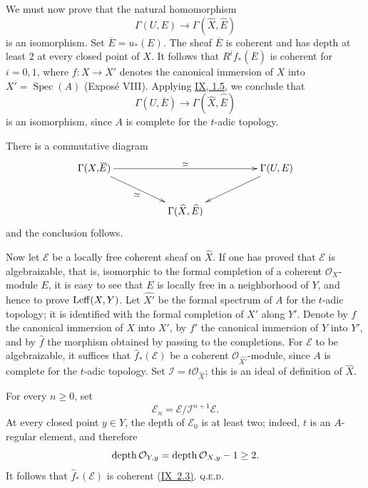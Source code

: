 We must now prove that the natural homomorphism
\begin{equation}\label{eq:X.1}
  \Gamma(U,E)\longrightarrow\Gamma(\widehat X,\widehat E)
\end{equation}
is an isomorphism. Set $\overline{\!E}=u_*(E)$. The sheaf
$\overline{\!E}$ is coherent and has depth at least $2$ at every closed
point of $X$. It follows that $R^if_*(\overline{\!E})$ is coherent for
$i=0,1$, where $f\colon X\to X'$ denotes the canonical immersion of $X$
into $X'=\operatorname{Spec}(A)$ (Exposé VIII). Applying \hyperref[IX.1.5]{IX, 1.5}, we
conclude that
\begin{equation}\label{eq:X.2}
  \Gamma(U,\overline{\!E})
  \longrightarrow
  \Gamma(\widehat X,\widehat{\overline{\!E}})
\end{equation}
is an isomorphism, since $A$ is complete for the $t$-adic topology.

There is a commutative diagram
\[
\xymatrix@C=18mm@R=9mm{
  \Gamma(X,\overline{\!E})
    \ar[rr]^{\simeq}
    \ar[dr]_{\simeq}
  && \Gamma(U,E)\ar[dl] \\
  & \Gamma(\widehat X,\widehat E) &
}
\]
and the conclusion follows.

\medskip
Now let $\mathcal E$ be a locally free coherent sheaf on $\widehat X$. If
one has proved that $\mathcal E$ is algebraizable, that is, isomorphic to the
formal completion of a coherent $\mathcal O_X$-module $E$, it is easy to see
that $E$ is locally free in a neighborhood of $Y$, and hence to prove
$\operatorname{Leff}(X,Y)$. Let $\widehat{X'}$ be the formal spectrum of $A$ for the
$t$-adic topology; it is identified with the formal completion of $X'$ along
$Y'$. Denote by $f$ the canonical immersion of $X$ into $X'$, by $f'$ the
canonical immersion of $Y$ into $Y'$, and by $\widehat f$ the morphism
obtained by passing to the completions. For $\mathcal E$ to be algebraizable,
it suffices that $\widehat f_*(\mathcal E)$ be a coherent
$\mathcal O_{\widehat{X'}}$-module, since $A$ is complete for the $t$-adic
topology.
Set $\mathcal I=t\mathcal O_{\widehat X}$; this is an ideal of definition of
$\widehat X$.

For every $n\geq0$, set
\[
  \mathcal E_n=\mathcal E/\mathcal I^{n+1}\mathcal E.
\]
At every closed point $y\in Y$, the depth of $\mathcal E_0$ is at least two;
indeed, $t$ is an $A$-regular element, and therefore
\[
  \operatorname{depth}\mathcal O_{Y,y}
  =\operatorname{depth}\mathcal O_{X,y}-1\geq2.
\]
It follows that $\widehat f_*(\mathcal E)$ is coherent (\hyperref[IX.2.3]{IX~2.3)}.
\hfill\textsc{q.e.d.}

